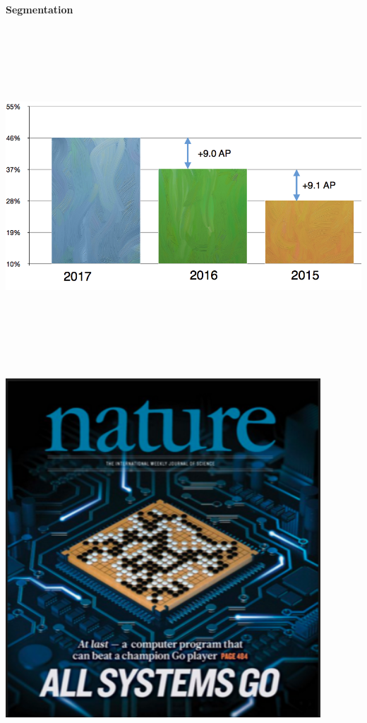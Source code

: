 \documentclass[landscape]{article}
\newcommand{\slide}[1]{\vfill
\eject
\centerline{\bf #1}
\vfill}
\begin{document}
{\slide{Segmentation}

\centerline{\includegraphics[height=5.0in]{../images/Coco17c}}

\slide{}

\centerline{\includegraphics[height=5.0in]{../images/alphago}}

}
\end{document}
